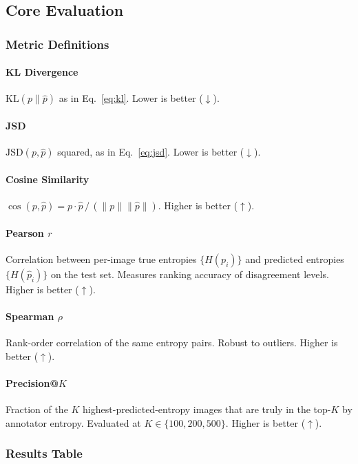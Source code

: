 \documentclass[11pt,a4paper]{article}
\newcommand{\KL}{\mathrm{KL}}
\newcommand{\JSD}{\mathrm{JSD}}
\begin{document}
\subsection{Core Evaluation}
\label{sec:eval}

\subsubsection{Metric Definitions}

\paragraph{KL Divergence} $\KL(p \| \hat{p})$ as in Eq.~\eqref{eq:kl}.
Lower is better ($\downarrow$).

\paragraph{JSD} $\JSD(p, \hat{p})$ squared, as in Eq.~\eqref{eq:jsd}.
Lower is better ($\downarrow$).

\paragraph{Cosine Similarity}
$\cos(p, \hat{p}) = p \cdot \hat{p}\,/\,(\|p\| \|\hat{p}\|)$.
Higher is better ($\uparrow$).

\paragraph{Pearson $r$} Correlation between per-image true entropies
$\{H(p_i)\}$ and predicted entropies $\{H(\hat{p}_i)\}$ on the test set.
Measures ranking accuracy of disagreement levels. Higher is better ($\uparrow$).

\paragraph{Spearman $\rho$} Rank-order correlation of the same entropy pairs.
Robust to outliers. Higher is better ($\uparrow$).

\paragraph{Precision@$K$}
Fraction of the $K$ highest-predicted-entropy images that are truly in the
top-$K$ by annotator entropy.
Evaluated at $K \in \{100, 200, 500\}$. Higher is better ($\uparrow$).

\subsubsection{Results Table}
\end{document}
